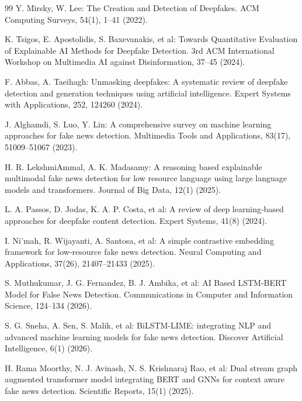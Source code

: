 \documentclass[runningheads]{llncs}
\begin{document}
\begin{thebibliography}{99}
Y. Mirsky, W. Lee: The Creation and Detection of Deepfakes. ACM Computing Surveys, 54(1), 1–41 (2022). 

K. Tsigos, E. Apostolidis, S. Baxevanakis, et al: Towards Quantitative Evaluation of Explainable AI Methods for Deepfake Detection. 3rd ACM International Workshop on Multimedia AI against Disinformation, 37–45 (2024). 

F. Abbas, A. Taeihagh: Unmasking deepfakes: A systematic review of deepfake detection and generation techniques using artificial intelligence. Expert Systems with Applications, 252, 124260 (2024). 

J. Alghamdi, S. Luo, Y. Lin: A comprehensive survey on machine learning approaches for fake news detection. Multimedia Tools and Applications, 83(17), 51009–51067 (2023). 

H. R. LekshmiAmmal, A. K. Madasamy: A reasoning based explainable multimodal fake news detection for low resource language using large language models and transformers. Journal of Big Data, 12(1) (2025). 

L. A. Passos, D. Jodas, K. A. P. Costa, et al: A review of deep learning‐based approaches for deepfake content detection. Expert Systems, 41(8) (2024). 

I. Ni’mah, R. Wijayanti, A. Santosa, et al: A simple contrastive embedding framework for low-resource fake news detection. Neural Computing and Applications, 37(26), 21407–21433 (2025). 

S. Muthukumar, J. G. Fernandez, B. J. Ambika, et al: AI Based LSTM-BERT Model for False News Detection. Communications in Computer and Information Science, 124–134 (2026). 

S. G. Sneha, A. Sen, S. Malik, et al: BiLSTM-LIME: integrating NLP and advanced machine learning models for fake news detection. Discover Artificial Intelligence, 6(1) (2026). 

H. Rama Moorthy, N. J. Avinash, N. S. Krishnaraj Rao, et al: Dual stream graph augmented transformer model integrating BERT and GNNs for context aware fake news detection. Scientific Reports, 15(1) (2025). 


\end{thebibliography}
\end{document}
